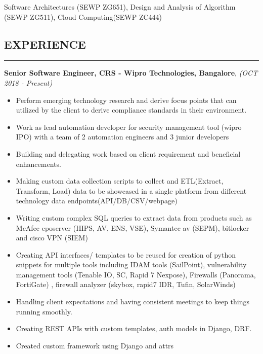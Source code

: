\documentclass[10pt,a4]{article}
\def\mydot{\textcolor{deep_blue}{\rule{0.75ex}{0.75ex}}}
\begin{document}
\begin{small}
 Software Architectures {\color{gray}(SEWP ZG651)}, Design and Analysis of Algorithm {\color{gray}(SEWP ZG511)}, Cloud Computing{\color{gray}(SEWP ZC444)}  \vspace{-0.25cm}\\




\vspace{-0.35cm}
\subsection*{\color{dark_blue}EXPERIENCE}
\vspace{-0.15cm}
\hrule
\vspace{0.1cm}

{\bf Senior Software Engineer, {\color{drkgray}CRS - Wipro Technologies, Bangalore}}, {\em \color{drkgray}(OCT 2018 - Present)}
\begin{itemize}
\item[\mydot] Perform emerging technology research and derive focus points that can utilized by the client to derive compliance standards in their environment.
\item[\mydot] Work as lead automation developer for security management tool (wipro IPO) with a team of 2 automation engineers and 3 junior developers
\item[\mydot] Building and delegating work based on client requirement and beneficial enhancements.
\item[\mydot] Making custom data collection scripts to collect and ETL(Extract, Transform, Load) data to be showcased in a single platform from different technology data endpoints(API/DB/CSV/webpage)
\item[\mydot] Writing custom complex SQL queries to extract data from products such as McAfee eposerver (HIPS, AV, ENS, VSE), Symantec av (SEPM), bitlocker and cisco VPN (SIEM)
\item[\mydot] Creating API interfaces/ templates to be reused for creation of python snippets for multiple tools including IDAM tools (SailPoint), vulnerability management tools (Tenable IO, SC, Rapid 7 Nexpose), Firewalls (Panorama, FortiGate) , firewall analyzer (skybox, rapid7 IDR, Tufin, SolarWinds)
\item[\mydot] Handling client expectations and having consistent meetings to keep things running smoothly.
\item[\mydot] Creating REST APIs with custom templates, auth models in Django, DRF.
\item[\mydot] Created custom framework using Django and attrs
\end{itemize}


\end{small}
\end{document}
